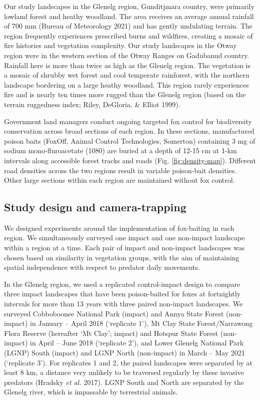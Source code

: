 \documentclass[]{elsarticle} %
\begin{document}
Our study landscapes in the Glenelg region, Gunditjmara country, were primarily lowland forest and heathy woodland. The area receives an average annual rainfall of 700 mm (Bureau of Meteorology 2021) and has gently undulating terrain. The region frequently experiences prescribed burns and wildfires, creating a mosaic of fire histories and vegetation complexity. Our study landscapes in the Otway region were in the western section of the Otway Ranges on Gadubanud country. Rainfall here is more than twice as high as the Glenelg region. The vegetation is a mosaic of shrubby wet forest and cool temperate rainforest, with the northern landscape bordering on a large heathy woodland. This region rarely experiences fire and is nearly ten times more rugged than the Glenelg region (based on the terrain ruggedness index; Riley, DeGloria, \& Elliot 1999).

Government land managers conduct ongoing targeted fox control for biodiversity conservation across broad sections of each region. In these sections, manufactured poison baits (FoxOff, Animal Control Technologies, Somerton) containing 3 mg of sodium mono-fluroacetate (1080) are buried at a depth of 12-15 cm at 1-km intervals along accessible forest tracks and roads (Fig. \ref{fig:density-map}). Different road densities across the two regions result in variable poison-bait densities. Other large sections within each region are maintained without fox control.

\hypertarget{study-design-and-camera-trapping}{%
\subsection{Study design and camera-trapping}\label{study-design-and-camera-trapping}}

We designed experiments around the implementation of fox-baiting in each region. We simultaneously surveyed one impact and one non-impact landscape within a region at a time. Each pair of impact and non-impact landscapes was chosen based on similarity in vegetation groups, with the aim of maintaining spatial independence with respect to predator daily movements.

In the Glenelg region, we used a replicated control-impact design to compare three impact landscapes that have been poison-baited for foxes at fortnightly intervals for more than 13 years with three paired non-impact landscapes. We surveyed Cobboboonee National Park (impact) and Annya State Forest (non-impact) in January -- April 2018 (`replicate 1'), Mt Clay State Forest/Narrawong Flora Reserve (hereafter `Mt Clay'; impact) and Hotspur State Forest (non-impact) in April -- June 2018 (`replicate 2'), and Lower Glenelg National Park (LGNP) South (impact) and LGNP North (non-impact) in March -- May 2021 (`replicate 3'). For replicates 1 and 2, the paired landscapes were separated by at least 8 km, a distance very unlikely to be traversed regularly by these invasive predators (Hradsky \emph{et al.} 2017). LGNP South and North are separated by the Glenelg river, which is impassable by terrestrial animals.
\end{document}
